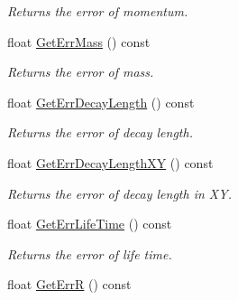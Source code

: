 \begin{DoxyCompactItemize}
\begin{DoxyCompactList}\small\item\em Returns the error of momentum. \end{DoxyCompactList}\item 
float \hyperlink{classKFParticle_a719c0871275fe63f83645fa4baff3720}{Get\+Err\+Mass} () const \hypertarget{classKFParticle_a719c0871275fe63f83645fa4baff3720}{}\label{classKFParticle_a719c0871275fe63f83645fa4baff3720}

\begin{DoxyCompactList}\small\item\em Returns the error of mass. \end{DoxyCompactList}\item 
float \hyperlink{classKFParticle_a5d1593128ff34775e02c91b1e23fdd6f}{Get\+Err\+Decay\+Length} () const \hypertarget{classKFParticle_a5d1593128ff34775e02c91b1e23fdd6f}{}\label{classKFParticle_a5d1593128ff34775e02c91b1e23fdd6f}

\begin{DoxyCompactList}\small\item\em Returns the error of decay length. \end{DoxyCompactList}\item 
float \hyperlink{classKFParticle_af1ae37c8dbace5d6486fbce3d954d2d9}{Get\+Err\+Decay\+Length\+XY} () const \hypertarget{classKFParticle_af1ae37c8dbace5d6486fbce3d954d2d9}{}\label{classKFParticle_af1ae37c8dbace5d6486fbce3d954d2d9}

\begin{DoxyCompactList}\small\item\em Returns the error of decay length in XY. \end{DoxyCompactList}\item 
float \hyperlink{classKFParticle_a28e29b46104f3e96c2923ba0204d1c08}{Get\+Err\+Life\+Time} () const \hypertarget{classKFParticle_a28e29b46104f3e96c2923ba0204d1c08}{}\label{classKFParticle_a28e29b46104f3e96c2923ba0204d1c08}

\begin{DoxyCompactList}\small\item\em Returns the error of life time. \end{DoxyCompactList}\item 
float \hyperlink{classKFParticle_ae1336ce640e8364c95d9ec2ce0e0ed09}{Get\+ErrR} () const \hypertarget{classKFParticle_ae1336ce640e8364c95d9ec2ce0e0ed09}{}\label{classKFParticle_ae1336ce640e8364c95d9ec2ce0e0ed09}


\end{DoxyCompactItemize}
